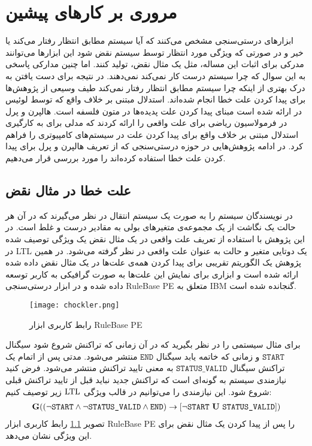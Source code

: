 \chapter{مروری بر کار‌های پیشین}
ابزار‌های درستی‌سنجی مشخص می‌کنند که آیا سیستم مطابق انتظار رفتار می‌کند یا خیر و در صورتی که ویژگی مورد انتظار توسط سیستم نقض شود این ابزارها می‌توانند مدرکی برای اثبات این مساله، مثل یک مثال نقض، تولید کنند.
اما چنین مدارکی پاسخی به این سوال که چرا سیستم درست کار نمی‌کند نمی‌دهند. 
در نتیجه برای دست یافتن به درک بهتری از اینکه چرا سیستم مطابق انتظار رفتار نمی‌کند طیف وسیعی از پژوهش‌ها برای  پیدا کردن علت خطا انجام شده‌اند.
استدلال مبتنی بر خلاف واقع که توسط لوئیس در 
\cite{lewis1973counterfactuals}
ارائه شده است مبنای پیدا کردن علت پدیده‌ها در متون فلسفه است.
هالپرن و پرل در 
\cite{hp}
فرمولاسیون ریاضی برای علت واقعی را ارائه کردند که مدلی برای به کارگیری استدلال مبتنی بر خلاف واقع برای پیدا کردن علت در سیستم‌های کامپیوتری را فراهم کرد.
در ادامه پژوهش‌هایی در حوزه درستی‌سنجی که از تعریف هالپرن و پرل برای پیدا کردن علت خطا استفاده کرده‌اند را مورد بررسی قرار می‌دهیم.


\section{علت خطا در مثال نقض}
در
\cite{chockler}
نویسندگان سیستم را به صورت یک سیستم انتقال
در نظر می‌گیرند که در آن هر حالت یک نگاشت از یک مجموعه‌ی متغیر‌های بولی به مقادیر درست و غلط است.
در این پژوهش با استفاده از تعریف علت واقعی در یک مثال نقض یک ویژگی توصیف شده در
LTL
یک دوتایی‌ متغیر و حالت به عنوان علت واقعی در نظر گرفته می‌شود.
در همین پژوهش یک الگوریتم تقریبی برای پیدا کردن همه‌ی علت‌ها در یک مثال نقض داده شده ارائه شده است و ابزاری برای نمایش این علت‌ها به صورت گرافیکی به کاربر توسعه داده شده و در ابزار درستی‌سنجی
RuleBase PE
متعلق به
IBM
گنجانده شده است.
\begin{figure}
    \centering
    \texttt{[image: chockler.png]}
    \caption{رابط کاربری ابزار
        RuleBase PE
    }
    \label{fig:rulebase}
\end{figure}
برای مثال
سیستمی را در نظر بگیرید که در آن زمانی که تراکنش شروع شود سیگنال 
$\texttt{START}$
و زمانی که خاتمه یابد سیگنال 
$\texttt{END}$
منتشر می‌شود.
مدتی پس از اتمام یک تراکنش سیگنال 
$\texttt{STATUS\_VALID}$
به معنی تایید تراکنش منتشر می‌شود.
فرض کنید نیازمندی سیستم به گونه‌ای است که تراکنش جدید نباید قبل از تایید تراکنش قبلی شروع شود. 
این نیازمندی را می‌توانیم در قالب ویژگی 
$\mathrm{LTL}$
زیر توصیف کنیم:
\begin{align*}
    \boldsymbol{\mr{G}}((\neg \texttt{START} \wedge \neg \texttt{STATUS\_VALID} \wedge \texttt{END}) 
    \ra [\neg \texttt{START}\ \boldsymbol{\mr{U}}\ \texttt{STATUS\_VALID}])
\end{align*}
تصویر
\ref{fig:rulebase}
رابط کاربری ابزار 
RuleBase PE
را پس از پیدا کردن یک مثال نقض برای این ویژگی نشان می‌دهد.

